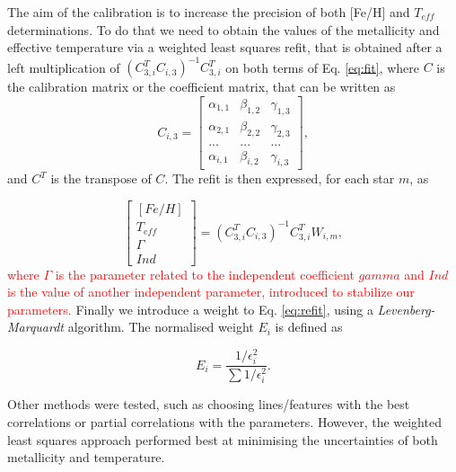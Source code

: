 \documentclass{aa}
\newcommand\T{\rule{0pt}{2.6ex}}
\begin{document}
The aim of the calibration is to increase the precision of both [Fe/H] and $T_{eff}$ determinations. To do that we need to obtain the values of the metallicity and effective temperature via a weighted least squares refit, that is obtained after a left multiplication of $(C^{T}_{3,i}C_{i,3})^{-1}C^{T}_{3,i}$ on both terms of Eq. \ref{eq:fit}, where $C$ is the calibration matrix or the coefficient matrix, that can be written as
\begin{equation}
C_{i,3} = \left[\begin{array}{ccc} \alpha_{1,1} & \beta_{1,2} & \gamma_{1,3} \\ \alpha_{2,1} & \beta_{2,2} & \gamma_{2,3} \\... & ... & ...\\ \alpha_{i,1} & \beta_{i,2} & \gamma_{i,3} \end{array}\right],
\end{equation}
and $C^{T}$ is the transpose of $C$. The refit is then expressed, for each star $m$, as

\begin{equation}
\label{eq:refit}
\left[\begin{array}{c} [Fe/H] \\T_{eff} \\ \Gamma \\ Ind \end{array}\right] =  (C^{T}_{3,i}C_{i,3})^{-1}C^{T}_{3,i}W_{i,m},
\end{equation}
\textcolor{red}{where $\Gamma$ is the parameter related to the independent coefficient $gamma$ and $Ind$ is the value of another independent parameter, introduced to stabilize our parameters.} Finally we introduce a weight to Eq. \ref{eq:refit}, using a \textit{Levenberg-Marquardt} \citep[][]{Press-1992} algorithm. The normalised weight $E_{i}$ is defined as




\begin{equation}
E_{i} = \frac{1/\epsilon_{i}^{2}}{\sum{1/\epsilon_{i}^{2}}}.
\label{eq:weight}
\end{equation}

Other methods were tested, such as choosing lines/features with the best correlations or partial correlations with the parameters. However, the weighted least squares approach performed best at minimising the uncertainties of both metallicity and temperature. 
\end{document}
